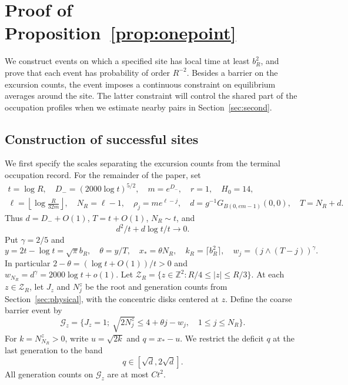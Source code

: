 \documentclass[11pt,letterpaper,reqno]{amsart}
\numberwithin{equation}{section}
\theoremstyle{remark}
\begin{document}
\section{Proof of Proposition~\ref{prop:onepoint}}\label{sec:events}
We construct events on which a specified site has local time at least $b_R^2$, and prove that each event has probability of order $R^{-2}$. Besides a barrier on the excursion counts, the event imposes a continuous constraint on equilibrium averages around the site. The latter constraint will control the shared part of the occupation profiles when we estimate nearby pairs in Section~\ref{sec:second}.

\subsection{Construction of successful sites}\label{sec:lowerscales}
We first specify the scales separating the excursion counts from the terminal occupation record. For the remainder of the paper, set
\begin{equation}\label{eq:5.1}
\begin{gathered}
t=\log R,\quad D_-=(2000\log t)^{5/2},\quad m=e^{D_-},\quad r=1,\quad H_0=14,\\
\ell=\left\lfloor\log\frac R{32m}\right\rfloor,\quad N_R=\ell-1,
\quad\rho_j=me^{\ell-j},\quad
d=g^{-1}G_{B(0,em-1)}(0,0),\quad T=N_R+d.
\end{gathered}
\end{equation}
Thus $d=D_-+O(1)$, $T=t+O(1)$, $N_R\sim t$, and
\begin{equation}\label{eq:5.2}
d^2/t+d\log t/t\longrightarrow0.
\end{equation}
Put $\gamma=2/5$ and
\begin{equation}\label{eq:5.3}
y=2t-\log t=\sqrt\pi b_R,\quad \theta=y/T,\quad
x_*=\theta N_R,\quad k_R=\lceil b_R^2\rceil,\quad
w_j=(j\wedge(T-j))^\gamma.
\end{equation}
In particular $2-\theta=(\log t+O(1))/t>0$ and
$w_{N_R}=d^\gamma=2000\log t+o(1)$.
Let $\mathscr Z_R=\{z\in\mathbb Z^2:R/4\le |z|\le R/3\}$.
At each $z\in\mathscr Z_R$, let $J_z$ and $N_j^z$ be the root and generation counts from
Section~\ref{sec:physical}, with the concentric disks centered at $z$. Define the coarse barrier event by
\begin{equation}\label{eq:5.4}
\mathcal G_z=\{J_z=1;\ \sqrt{2N_j^z}\le4+\theta j-w_j,
\quad 1\le j\le N_R\}.
\end{equation}
For $k=N_{N_R}^z>0$, write $u=\sqrt{2k}$ and $q=x_*-u$. We restrict the deficit $q$ at the last generation to the band
\begin{equation}\label{eq:5.5}
q\in[\sqrt d,2\sqrt d].
\end{equation}
All generation counts on $\mathcal G_z$ are at most $Ct^2$.
\end{document}
